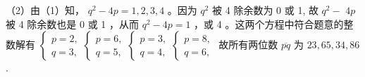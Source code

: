 \documentclass[10pt]{article}
\begin{document}
（2）由（1）知， $q^{2}-4 p=1,2,3,4$ 。因为 $q^{2}$ 被 4 除余数为 0 或 1, 故 $q^{2}-$ $4 p$ 被 4 除余数也是 0 或 1 ，从而 $q^{2}-4 p=1$ ，或 4 。这两个方程中符合题意的整数解有 $\left\{\begin{array}{l}p=2, \\ q=3,\end{array}\left\{\begin{array}{l}p=6, \\ q=5,\end{array}\left\{\begin{array}{l}p=3, \\ q=4,\end{array}\left\{\begin{array}{l}p=8, \\ q=6,\end{array}\right.\right.\right.\right.$ 故所有两位数 $\overline{p q}$ 为 $23,65,34,86$.
\end{document}
